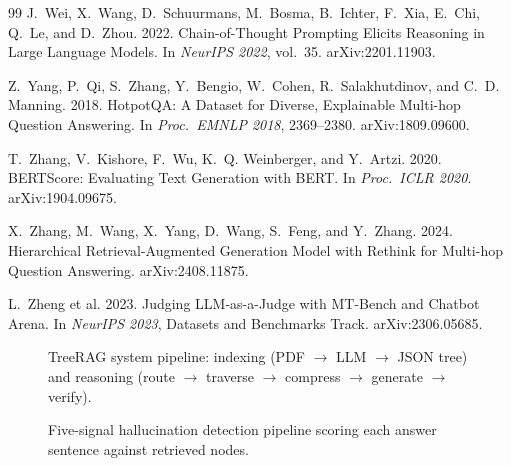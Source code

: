 \documentclass[sigconf,review,anonymous]{acmart}
\begin{document}
\begin{thebibliography}{99}
J.~Wei, X.~Wang, D.~Schuurmans, M.~Bosma, B.~Ichter, F.~Xia, E.~Chi, Q.~Le, and
D.~Zhou. 2022. Chain-of-Thought Prompting Elicits Reasoning in Large Language
Models. In \emph{NeurIPS 2022}, vol.~35. arXiv:2201.11903.

Z.~Yang, P.~Qi, S.~Zhang, Y.~Bengio, W.~Cohen, R.~Salakhutdinov, and C.~D.
Manning. 2018. HotpotQA: A Dataset for Diverse, Explainable Multi-hop Question
Answering. In \emph{Proc.\ EMNLP 2018}, 2369--2380. arXiv:1809.09600.

T.~Zhang, V.~Kishore, F.~Wu, K.~Q. Weinberger, and Y.~Artzi. 2020. BERTScore:
Evaluating Text Generation with BERT. In \emph{Proc.\ ICLR 2020}. arXiv:1904.09675.

X.~Zhang, M.~Wang, X.~Yang, D.~Wang, S.~Feng, and Y.~Zhang. 2024. Hierarchical
Retrieval-Augmented Generation Model with Rethink for Multi-hop Question
Answering. arXiv:2408.11875.

L.~Zheng et al. 2023. Judging LLM-as-a-Judge with MT-Bench and Chatbot Arena.
In \emph{NeurIPS 2023}, Datasets and Benchmarks Track. arXiv:2306.05685.

\end{thebibliography}

\begin{figure}[t]
\centering
\caption{TreeRAG system pipeline: indexing (PDF $\rightarrow$ LLM $\rightarrow$
JSON tree) and reasoning (route $\rightarrow$ traverse $\rightarrow$ compress
$\rightarrow$ generate $\rightarrow$ verify).}
\label{fig:arch}
\end{figure}

\begin{figure}[t]
\centering
\caption{Five-signal hallucination detection pipeline scoring each answer
sentence against retrieved nodes.}
\label{fig:halluc}
\end{figure}
\end{document}
